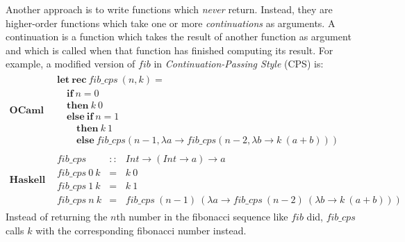 \documentclass[10pt,a4paper]{exam} %
\begin{document}
\begin{questions}
    Another approach is to write functions which \emph{never} return. Instead, they are higher-order functions which take one or more \emph{continuations} as arguments. A continuation is a function which takes the result of another function as argument and which is called when that function has finished computing its result. For example, a modified version of $\mathit{fib}$ in \emph{Continuation-Passing Style} (CPS) is:
    \begin{displaymath}
    \begin{array}{l|l}
    \textbf{OCaml} & \begin{array}{l}
    \mathbf{let}~\mathbf{rec}~\mathit{fib\_cps}~(n,k) = \\
    \quad \mathbf{if}~n=0 \\
    \quad \mathbf{then}~k~0 \\
    \quad \mathbf{else}~\mathbf{if}~n=1 \\
    \qquad \mathbf{then}~k~1 \\
    \qquad \mathbf{else}~\mathit{fib}\_cps(n-1, \lambda a \to \mathit{fib\_cps}(n-2, \lambda b \to k~(a+b))) 
    \end{array} \\ \hline 
    \textbf{Haskell} & \begin{array}{lcl}
    \mathit{fib\_cps} & :: & \mathit{Int} \to (\mathit{Int} \to a) \to a \\
    \mathit{fib\_cps}~0~k & = & k~0 \\
    \mathit{fib\_cps}~1~k & = & k~1 \\
    \mathit{fib\_cps}~n~k & = & \mathit{fib\_cps}~(n-1)~(\lambda a \to \mathit{fib\_cps}~(n-2)~(\lambda b \to k~(a+b))) 
    \end{array}
    \end{array}
    \end{displaymath}
    Instead of returning the $n$th number in the fibonacci sequence like $\mathit{fib}$ did, $\mathit{fib\_cps}$ calls $k$ with the corresponding fibonacci number instead. 
    \begin{parts}
        

\end{parts}
\end{questions}
\end{document}
